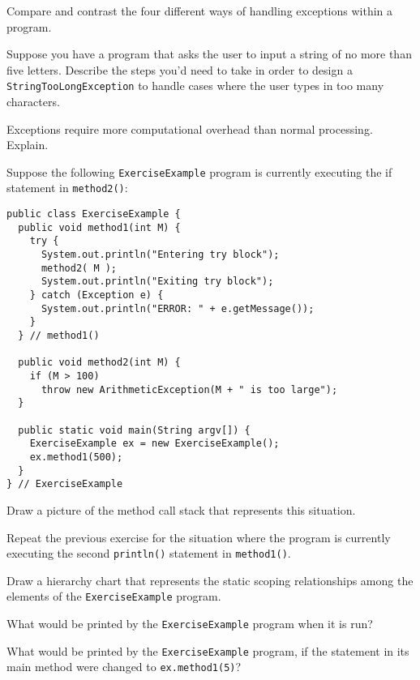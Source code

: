 \begin{EXRtwo}
\item  Compare and contrast the four different ways of handling
exceptions within a program.

\item  Suppose you have a program that asks the user to input
a string of no more than five letters.  Describe the steps you'd
need to take in order to design a {\tt StringTooLongException}
to handle cases where the user types in too many characters.

\item  Exceptions require more computational overhead than
normal processing.  Explain.

\item  Suppose the following {\tt ExerciseExample} program
is currently executing the if statement in {\tt method2()}: 

\begin{jjjlisting}
\begin{lstlisting}
public class ExerciseExample {
  public void method1(int M) {
    try {
      System.out.println("Entering try block");
      method2( M );
      System.out.println("Exiting try block");
    } catch (Exception e) {
      System.out.println("ERROR: " + e.getMessage());
    }
  } // method1()

  public void method2(int M) {
    if (M > 100)
      throw new ArithmeticException(M + " is too large");
  }

  public static void main(String argv[]) {
    ExerciseExample ex = new ExerciseExample();
    ex.method1(500);
  }
} // ExerciseExample
\end{lstlisting}
\end{jjjlisting}

\noindent Draw a picture of the  method call stack that represents this situation.

\item  Repeat the previous exercise for the situation where the
program is currently executing the second {\tt println()}
statement in {\tt method1()}.

\item  Draw a hierarchy chart that represents the static scoping
relationships among the elements of the {\tt ExerciseExample} program.

\item  What would be printed by the {\tt ExerciseExample} program
when it is run?

\item  What would be printed by the {\tt ExerciseExample}
program, if the statement in its main method were changed to
{\tt ex.method1(5)}?


\end{EXRtwo}
